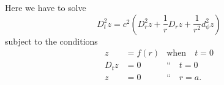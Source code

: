 \documentclass[oneside,12pt]{book}
\begin{document}
Here we have to solve 
\begin{equation*}
    D_t^2z=c^2\left(D_r^2z+\frac{1}{r}D_rz+\frac{1}{r^2}d_\phi^2z \right)
    \tag{[XI] Art. 1}
\end{equation*}
subject to the conditions 
\begin{align}
    z&=f(r) & \text{when} \quad t=0 \label{eq11.1} \\ 
    D_tz&=0 & \text{``}\quad t=0 \label{eq11.2} \\ 
    z&=0 & \text{``} \quad r=a. \label{eq11.3} 
\end{align} \par 
\end{document}

